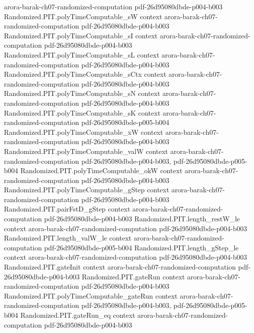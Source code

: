 \begin{theorem}
  {arora-barak-ch07-randomized-computation}
  {pdf-26d95080dbde-p004-b003}
\proofstep
  {Randomized.PIT.polyTimeComputable_sW}
  {context}
  {arora-barak-ch07-randomized-computation}
  {pdf-26d95080dbde-p004-b003}
\proofstep
  {Randomized.PIT.polyTimeComputable_sI}
  {context}
  {arora-barak-ch07-randomized-computation}
  {pdf-26d95080dbde-p004-b003}
\proofstep
  {Randomized.PIT.polyTimeComputable_sL}
  {context}
  {arora-barak-ch07-randomized-computation}
  {pdf-26d95080dbde-p004-b003}
\proofstep
  {Randomized.PIT.polyTimeComputable_sCtx}
  {context}
  {arora-barak-ch07-randomized-computation}
  {pdf-26d95080dbde-p004-b003}
\proofstep
  {Randomized.PIT.polyTimeComputable_sN}
  {context}
  {arora-barak-ch07-randomized-computation}
  {pdf-26d95080dbde-p004-b003}
\proofstep
  {Randomized.PIT.polyTimeComputable_sK}
  {context}
  {arora-barak-ch07-randomized-computation}
  {pdf-26d95080dbde-p005-b004}
\proofstep
  {Randomized.PIT.polyTimeComputable_xW}
  {context}
  {arora-barak-ch07-randomized-computation}
  {pdf-26d95080dbde-p004-b003}
\proofstep
  {Randomized.PIT.polyTimeComputable_valW}
  {context}
  {arora-barak-ch07-randomized-computation}
  {pdf-26d95080dbde-p004-b003,
    pdf-26d95080dbde-p005-b004}
\proofstep
  {Randomized.PIT.polyTimeComputable_okW}
  {context}
  {arora-barak-ch07-randomized-computation}
  {pdf-26d95080dbde-p004-b003}
\proofstep
  {Randomized.PIT.polyTimeComputable_gStep}
  {context}
  {arora-barak-ch07-randomized-computation}
  {pdf-26d95080dbde-p004-b003}
\proofstep
  {Randomized.PIT.pairFstD_gStep}
  {context}
  {arora-barak-ch07-randomized-computation}
  {pdf-26d95080dbde-p004-b003}
\proofstep
  {Randomized.PIT.length_restW_le}
  {context}
  {arora-barak-ch07-randomized-computation}
  {pdf-26d95080dbde-p004-b003}
\proofstep
  {Randomized.PIT.length_valW_le}
  {context}
  {arora-barak-ch07-randomized-computation}
  {pdf-26d95080dbde-p005-b004}
\proofstep
  {Randomized.PIT.length_gStep_le}
  {context}
  {arora-barak-ch07-randomized-computation}
  {pdf-26d95080dbde-p004-b003}
\proofstep
  {Randomized.PIT.gateInit}
  {context}
  {arora-barak-ch07-randomized-computation}
  {pdf-26d95080dbde-p004-b003}
\proofstep
  {Randomized.PIT.gateRun}
  {context}
  {arora-barak-ch07-randomized-computation}
  {pdf-26d95080dbde-p004-b003}
\proofstep
  {Randomized.PIT.polyTimeComputable_gateRun}
  {context}
  {arora-barak-ch07-randomized-computation}
  {pdf-26d95080dbde-p004-b003,
    pdf-26d95080dbde-p005-b004}
\proofstep
  {Randomized.PIT.gateRun_eq}
  {context}
  {arora-barak-ch07-randomized-computation}
  {pdf-26d95080dbde-p004-b003}
\proofstep

\end{theorem}
